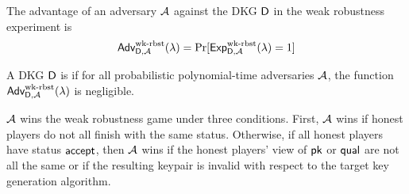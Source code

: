 The advantage of an adversary $\mathcal{A}$ against the DKG $\mathsf{D}$ in the weak robustness experiment is
\[
  \textsf{\upshape Adv}^{\textrm{\upshape wk-rbst}}_{\mathsf{D},\mathcal{A}}(\lambda) = \Pr[\textsf{Exp}^{\textrm{wk-rbst}}_{\mathsf{D},\mathcal{A}}(\lambda) = 1 ]
\]

\begin{definition}
A DKG $\mathsf{D}$ is  if for all probabilistic polynomial-time adversaries $\mathcal{A}$,
the function $\textsf{\upshape Adv}^{\textrm{\upshape wk-rbst}}_{\mathsf{D},\mathcal{A}}(\lambda)$  is negligible.
\end{definition}


$\mathcal{A}$ wins the weak robustness game under three conditions.
First, $\mathcal{A}$ wins if honest players do not all finish with the same status.
Otherwise, if all honest players have status $\mathsf{accept}$, then $\mathcal{A}$ wins
if the honest players' view of $\mathsf{pk}$ or $\mathsf{qual}$ are not all the same or if
the resulting keypair is invalid with respect to the target key generation algorithm.



